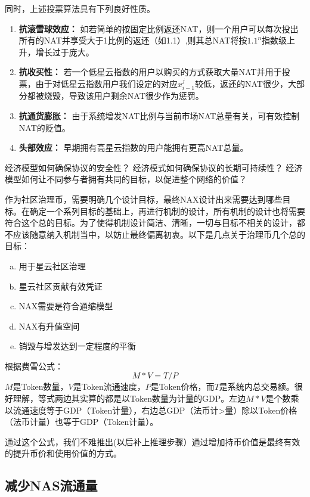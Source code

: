 同时，上述投票算法具有下列良好性质。
\begin{enumerate}
	\item \textbf{抗滚雪球效应：} 如若简单的按固定比例返还NAT，则一个用户可以每次投出所有的NAT并享受大于1比例的返还（如1.1）,则其总NAT将按$1.1^n$指数级上升，增长过于庞大。
	\item \textbf{抗收买性：} 若一个低星云指数的用户以购买的方式获取大量NAT并用于投票，由于对低星云指数用户我们设定的对应$x_{i-1}^j$较低，返还的NAT很少，大部分都被烧毁，导致该用户剩余NAT很少作为惩罚。
	\item \textbf{抗通货膨胀：} 由于系统增发NAT比例与当前市场NAT总量有关，可有效控制NAT的贬值。
	\item \textbf{头部效应：} 早期拥有高星云指数的用户能拥有更高NAT总量。
\end{enumerate}





经济模型如何确保协议的安全性？
经济模式如何确保协议的长期可持续性？
经济模型如何让不同参与者拥有共同的目标，以促进整个网络的价值？

作为社区治理币，需要明确几个设计目标，最终NAX设计出来需要达到哪些目标。在确定一个系列目标的基础上，再进行机制的设计，所有机制的设计也将需要符合这个总的目标。为了使得机制设计简洁、清晰，一切与目标不相关的设计，都不应该随意纳入机制当中，以妨止最终偏离初衷。以下是几点关于治理币几个总的目标：

\begin{enumerate}[a.]
   \item 用于星云社区治理
   \item 星云社区贡献有效凭证
   \item NAX需要是符合通缩模型
   \item NAX有升值空间
   \item 销毁与增发达到一定程度的平衡
\end{enumerate}


根据费雪公式：
\begin{equation}
    M * V = T / P
\end{equation}
\(M\)是Token数量，\(V\)是Token流通速度，\(P\)是Token价格，而\(T\)是系统内总交易额。很好理解，等式两边其实算的都是以Token数量为计量的GDP。左边\(M * V\)是个数乘以流通速度等于GDP（Token计量），右边总GDP（法币计>量）除以Token价格（法币计量）也等于GDP（Token计量）。

通过这个公式，我们不难推出(以后补上推理步骤）通过增加持币价值是最终有效的提升币价和使用价值的方式。

\subsection{减少NAS流通量} 
